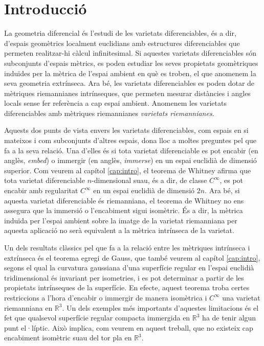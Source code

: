 \chapter{Introducci\'o}

La geometria diferencial és l'estudi de les varietats diferenciables, és a dir, d'espais geomètrics localment euclidians amb estructures diferenciables que permeten realitzar-hi càlcul infinitesimal. Si aquestes varietats diferenciables són subconjunts d'espais mètrics, es poden estudiar les seves propietats geomètriques induïdes per la mètrica de l'espai ambient en què es troben, el que anomenem la seva geometria extrínseca. Ara bé, les varietats diferenciables es poden dotar de mètriques riemannianes intrínseques, que permeten mesurar distàncies i angles locals sense fer referència a cap espai ambient. Anomenem les varietats diferenciables amb mètriques riemannianes \textit{varietats riemannianes}.

Aquests dos punts de vista envers les varietats diferenciables, com espais en si mateixos i com subconjunts d'altres espais, dona lloc a moltes preguntes pel que fa a la seva relació. Una d'elles és si tota varietat diferenciable es pot encabir (en anglès, \textit{embed}) o immergir (en anglès, \textit{immerse}) en un espai euclidià de dimensió superior. Com veurem al capítol \ref{cap:intro}, el teorema de Whitney afirma que tota varietat diferenciable $n$-dimensional suau, és a dir, de classe $C^\infty$, es pot encabir amb regularitat $C^\infty$ en un espai euclidià de dimensió $2n$. Ara bé, si aquesta varietat diferenciable és riemanniana, el teorema de Whitney no ens assegura que la immersió o l'encabiment sigui isomètric. És a dir, la mètrica induïda per l'espai ambient sobre la imatge de la varietat riemanniana per aquesta aplicació no serà equivalent a la mètrica intrínseca de la varietat. 

Un dels resultats clàssics pel que fa a la relació entre les mètriques intrínseca i extrínseca és el teorema egregi de Gauss, que també veurem al capítol \ref{cap:intro}, segons el qual la curvatura gaussiana d'una superfície regular en l'espai euclidià tridimensional és invariant per isometries, i es pot determinar a partir de les propietats intrínseques de la superfície. En efecte, aquest teorema troba certes restriccions a l'hora d'encabir o immergir de manera isomètrica i $C^\infty$ una varietat riemanniana en $\mathbb R^3$. Un dels exemples més importants d'aquestes limitacions és el fet que qualsevol superfície regular compacta immergida en $\mathbb R^3$ ha de tenir algun punt el·líptic. Això implica, com veurem en aquest treball, que no existeix cap encabiment isomètric suau del tor pla en $\mathbb R^3$.

